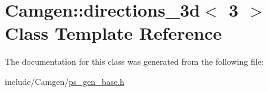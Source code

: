 \hypertarget{a00135}{}\section{Camgen\+:\+:directions\+\_\+3d$<$ 3 $>$ Class Template Reference}
\label{a00135}


The documentation for this class was generated from the following file\+:\begin{DoxyCompactItemize}
\item 
include/\+Camgen/\hyperlink{a00743}{ps\+\_\+gen\+\_\+base.\+h}\end{DoxyCompactItemize}
